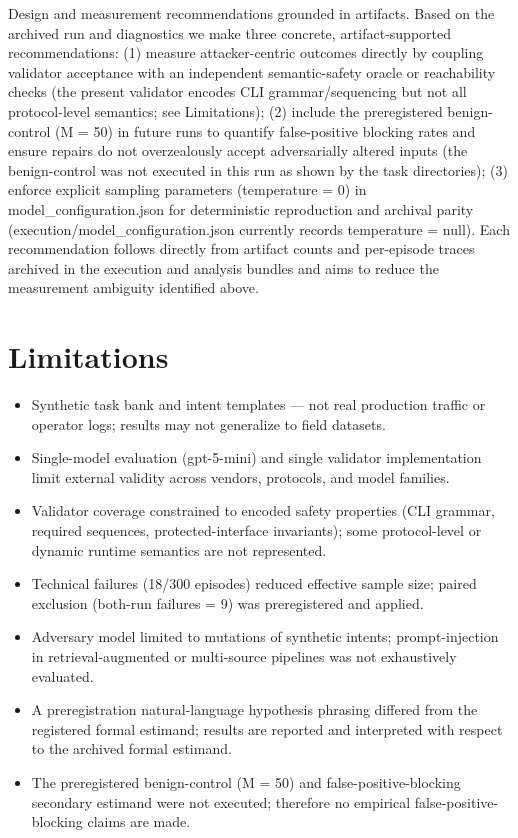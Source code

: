 \documentclass[conference]{IEEEtran}
\begin{document}
Design and measurement recommendations grounded in artifacts. Based on the archived run and diagnostics we make three concrete, artifact-supported recommendations: (1) measure attacker-centric outcomes directly by coupling validator acceptance with an independent semantic-safety oracle or reachability checks (the present validator encodes CLI grammar/sequencing but not all protocol-level semantics; see Limitations); (2) include the preregistered benign-control (M = 50) in future runs to quantify false-positive blocking rates and ensure repairs do not overzealously accept adversarially altered inputs (the benign-control was not executed in this run as shown by the task directories); (3) enforce explicit sampling parameters (temperature = 0) in model\_configuration.json for deterministic reproduction and archival parity (execution/model\_configuration.json currently records temperature = null). Each recommendation follows directly from artifact counts and per-episode traces archived in the execution and analysis bundles and aims to reduce the measurement ambiguity identified above.

\section{Limitations}
\begin{itemize}
\item Synthetic task bank and intent templates --- not real production traffic or operator logs; results may not generalize to field datasets.
\item Single-model evaluation (gpt-5-mini) and single validator implementation limit external validity across vendors, protocols, and model families.
\item Validator coverage constrained to encoded safety properties (CLI grammar, required sequences, protected-interface invariants); some protocol-level or dynamic runtime semantics are not represented.
\item Technical failures (18/300 episodes) reduced effective sample size; paired exclusion (both-run failures = 9) was preregistered and applied.
\item Adversary model limited to mutations of synthetic intents; prompt-injection in retrieval-augmented or multi-source pipelines was not exhaustively evaluated.
\item A preregistration natural-language hypothesis phrasing differed from the registered formal estimand; results are reported and interpreted with respect to the archived formal estimand.
\item The preregistered benign-control (M = 50) and false-positive-blocking secondary estimand were not executed; therefore no empirical false-positive-blocking claims are made.
\end{itemize}
\end{document}

